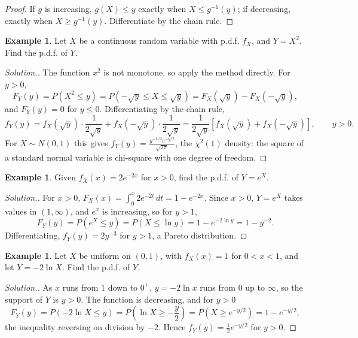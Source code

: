\documentclass[12pt,a4paper]{report}
\theoremstyle{definition}
\newtheorem{example}[thm]{Example}
\theoremstyle{plain}
\newenvironment{solution}
  {\renewcommand{\qedsymbol}{}\begin{proof}[\textit{Solution}.]}
  {\end{proof}}
\begin{document}
\begin{proof}
If $g$ is increasing, $g(X)\leq y$ exactly when $X\leq g^{-1}(y)$; if
decreasing, exactly when $X\geq g^{-1}(y)$. Differentiate by the chain rule.
\end{proof}

\begin{example}
\label{ex:cdfsquare}
Let $X$ be a continuous random variable with p.d.f. $f_X$, and $Y = X^2$. Find
the p.d.f. of $Y$.
\end{example}

\begin{solution}
The function $x^2$ is not monotone, so apply the method directly. For $y > 0$,
\[F_Y(y) = P(X^2 \leq y) = P(-\sqrt{y} \leq X \leq \sqrt{y}) = F_X(\sqrt{y}) -
F_X(-\sqrt{y}) ,\]
and $F_Y(y) = 0$ for $y\leq 0$. Differentiating by the chain rule,
\[f_Y(y) = f_X(\sqrt{y}) \cdot \frac{1}{2\sqrt{y}} + f_X(-\sqrt{y}) \cdot
\frac{1}{2\sqrt{y}} = \frac{1}{2\sqrt{y}} \left[ f_X(\sqrt{y}) +
f_X(-\sqrt{y}) \right], \qquad y > 0 .\]
For $X\sim N(0,1)$ this gives $f_Y(y) = \frac{y^{-1/2}e^{-y/2}}{\sqrt{2\pi}}$,
the $\chi^2(1)$ density: the square of a standard normal variable is chi-square
with one degree of freedom.
\end{solution}

\begin{example}
\label{ex:cdfexp}
Given $f_X(x) = 2e^{-2x}$ for $x > 0$, find the p.d.f. of $Y = e^X$.
\end{example}

\begin{solution}
For $x > 0$, $F_X(x) = \int_0^x 2e^{-2t}\, dt = 1 - e^{-2x}$. Since $x > 0$,
$Y = e^X$ takes values in $(1, \infty)$, and $e^x$ is increasing, so for $y>1$,
\[F_Y(y) = P(e^X \leq y) = P(X \leq \ln y) = 1 - e^{-2\ln y} = 1 - y^{-2} .\]
Differentiating, $f_Y(y) = 2y^{-3}$ for $y > 1$, a Pareto distribution.
\end{solution}

\begin{example}
\label{ex:cdfloguniform}
Let $X$ be uniform on $(0, 1)$, with $f_X(x) = 1$ for $0 < x < 1$, and let
$Y = -2\ln X$. Find the p.d.f. of $Y$.
\end{example}

\begin{solution}
As $x$ runs from $1$ down to $0^+$, $y = -2\ln x$ runs from $0$ up to $\infty$,
so the support of $Y$ is $y > 0$. The function is decreasing, and for $y>0$
\[F_Y(y) = P(-2\ln X \leq y) = P\left(\ln X \geq -\frac{y}{2}\right) = P\left(X
\geq e^{-y/2}\right) = 1 - e^{-y/2},\]
the inequality reversing on division by $-2$. Hence
$f_Y(y) = \frac{1}{2} e^{-y/2}$ for $y > 0$.
\end{solution}
\end{document}
